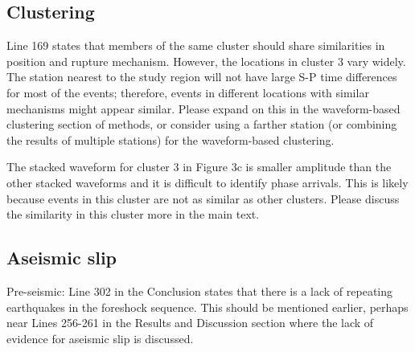 \documentclass[10pt]{extarticle}
\begin{document}
\subsection*{Clustering}

\begin{ReviewerComment}{2}
\noindent 
Line 169 states that members of the same cluster should share similarities in position and rupture mechanism.  However, the locations in cluster 3 vary widely. The station nearest to the study region will not have large S-P time differences for most of the events; therefore, events in different locations with similar mechanisms might appear similar. Please expand on this in the waveform-based clustering section of methods, or consider using a farther station (or combining the results of multiple stations) for the waveform-based clustering.

\end{ReviewerComment}


\begin{Answer}
 \WorkInProgressRevTask
\end{Answer}
%
%



\begin{ReviewerComment}{2}
\noindent 
The stacked waveform for cluster 3 in Figure 3c is smaller amplitude than the other stacked waveforms and it is difficult to identify phase arrivals. This is likely because events in this cluster are not as similar as other clusters. Please discuss the similarity in this cluster more in the main text.

\end{ReviewerComment}


\begin{Answer}
 \WorkInProgressRevTask
\end{Answer}
%
%


\subsection*{Aseismic slip}


\begin{ReviewerComment}{2}
\noindent 
Pre-seismic: Line 302 in the Conclusion states that there is a lack of repeating earthquakes in the foreshock sequence. This should be mentioned earlier, perhaps near Lines 256-261 in the Results and Discussion section where the lack of evidence for aseismic slip is discussed.

\end{ReviewerComment}
\end{document}
